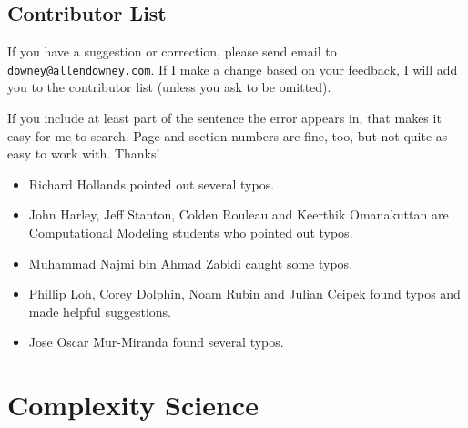 \documentclass[10pt]{book}
\begin{document}
\section*{Contributor List}


If you have a suggestion or correction, please send email to
{\tt downey@allendowney.com}.  If I make a change based on your
feedback, I will add you to the contributor list
(unless you ask to be omitted).

If you include at least part of the sentence the
error appears in, that makes it easy for me to search.  Page and
section numbers are fine, too, but not quite as easy to work with.
Thanks!

\small

\begin{itemize}

\item Richard Hollands pointed out several typos.

\item John Harley, Jeff Stanton, Colden Rouleau and
Keerthik Omanakuttan are Computational Modeling students who
pointed out typos.

\item Muhammad Najmi bin Ahmad Zabidi caught some typos.

\item Phillip Loh, Corey Dolphin, Noam Rubin and Julian Ceipek
found typos and made helpful suggestions.

\item Jose Oscar Mur-Miranda found several typos.


\end{itemize}

\normalsize

\clearemptydoublepage

\begin{latexonly}

\tableofcontents

\clearemptydoublepage

\end{latexonly}

\mainmatter

\chapter{Complexity Science}
\end{document}
